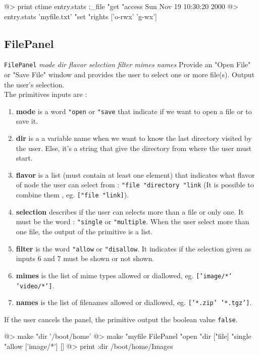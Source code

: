 \begin{verbatimtab}
@> print ctime entry.stats :_file "get "access
Sun Nov 19 10:30:20 2000
@> entry.stats 'myfile.txt' "set "rights ['o-rwx' 'g-wx']
\end{verbatimtab}

\subsection*{FilePanel} 

{\tt FilePanel} {\it mode dir flavor selection filter mimes names}
\newline\newline
Provide an "Open File" or "Save File" window and provides the user to select one or more file(s). Output the user's selection.\\

The primitives inputs are :
\begin{enumerate}
\item{\bf mode} is a word {\tt "open} or {\tt "save} that indicate if we want to open a file or to save it.
\item{\bf dir} is a a variable name when we want to know the last directory visited by the user. Else, it's a string that give the directory from where the user must start.
\item{\bf flavor} is a list (must contain at least one element) that indicates what flavor of node the user can select from : {\tt "file "directory "link} (It is possible to combine them , eg. {\tt ["file "link]}).
\item{\bf selection} describes if the user can selects more than a file or only one. It must be the word : {\tt "single} or {\tt "multiple}. When the user select more than one file, the output of the primitive is a list.
\item{\bf filter} is the word {\tt "allow} or {\tt "disallow}. It indicates if the selection given as inputs 6 and 7 must be shown or not shown.
\item{\bf mimes} is the list of mime types allowed or diallowed, eg. {\tt ['image/*' 'video/*']}.
\item{\bf names} is the list of filenames allowed or diallowed, eg. {\tt ['*.zip' '*.tgz']}. 
\end{enumerate}

If the user cancels the panel, the primitive output the boolean value {\tt false}.

\begin{verbatimtab}
@> make "dir '/boot/home'
@> make "myfile FilePanel "open "dir ["file] "single "allow ['image/*'] []
@> print :dir
/boot/home/Images
\end{verbatimtab}

